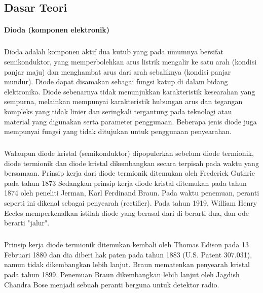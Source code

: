 \documentclass[12pt,a4paper]{article}
\begin{document}
\subsection{Dasar Teori}
\paragraph{ }
\textbf{Dioda (komponen elektronik)}
	\subparagraph{ }
	Dioda adalah komponen aktif dua kutub yang pada umumnya bersifat semikonduktor, yang memperbolehkan arus listrik mengalir ke satu arah (kondisi panjar maju) dan menghambat arus dari arah sebaliknya (kondisi panjar mundur). Diode dapat disamakan sebagai fungsi katup di dalam bidang elektronika. Diode sebenarnya tidak menunjukkan karakteristik kesearahan yang sempurna, melainkan mempunyai karakteristik hubungan arus dan tegangan kompleks yang tidak linier dan seringkali tergantung pada teknologi atau material yang digunakan serta parameter penggunaan. Beberapa jenis diode juga mempunyai fungsi yang tidak ditujukan untuk penggunaan penyearahan.
	\subparagraph{ }
	Walaupun diode kristal (semikonduktor) dipopulerkan sebelum diode termionik, diode termionik dan diode kristal dikembangkan secara terpisah pada waktu yang bersamaan. Prinsip kerja dari diode termionik ditemukan oleh Frederick Guthrie pada tahun 1873 Sedangkan prinsip kerja diode kristal ditemukan pada tahun 1874 oleh peneliti Jerman, Karl Ferdinand Braun. Pada waktu penemuan, peranti seperti ini dikenal sebagai penyearah (rectifier). Pada tahun 1919, William Henry Eccles memperkenalkan istilah diode yang berasal dari di berarti dua, dan ode berarti "jalur".
	\subparagraph{ }
	Prinsip kerja diode termionik ditemukan kembali oleh Thomas Edison pada 13 Februari 1880 dan dia diberi hak paten pada tahun 1883 (U.S. Patent 307.031), namun tidak dikembangkan lebih lanjut. Braun mematenkan penyearah kristal pada tahun 1899. Penemuan Braun dikembangkan lebih lanjut oleh Jagdish Chandra Bose menjadi sebuah peranti berguna untuk detektor radio.
\subparagraph{ }
\end{document}

